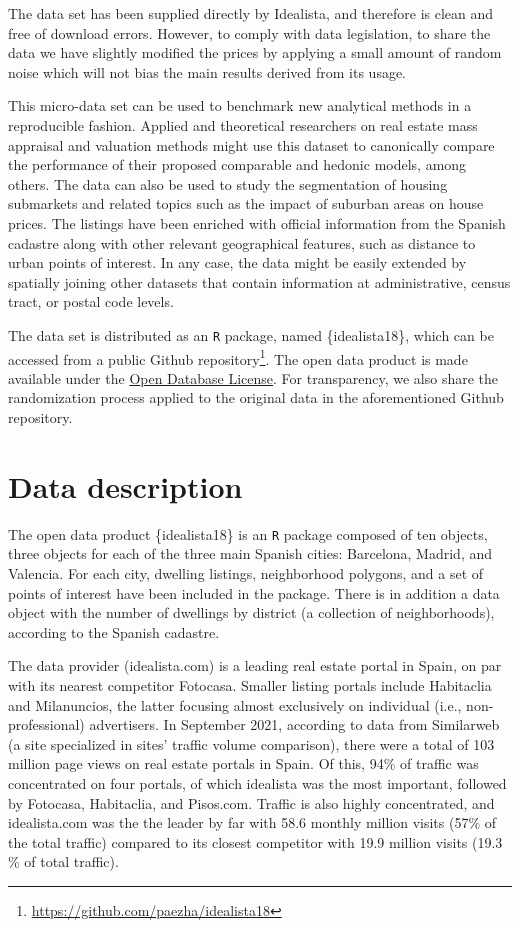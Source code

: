 \documentclass[Royal,times,sageh]{sagej}
\begin{document}
The data set has been supplied directly by Idealista, and therefore is
clean and free of download errors. However, to comply with data
legislation, to share the data we have slightly modified the prices by
applying a small amount of random noise which will not bias the main
results derived from its usage.

This micro-data set can be used to benchmark new analytical methods in a
reproducible fashion. Applied and theoretical researchers on real estate
mass appraisal and valuation methods might use this dataset to
canonically compare the performance of their proposed comparable and
hedonic models, among others. The data can also be used to study the
segmentation of housing submarkets and related topics such as the impact
of suburban areas on house prices. The listings have been enriched with
official information from the Spanish cadastre along with other relevant
geographical features, such as distance to urban points of interest. In
any case, the data might be easily extended by spatially joining other
datasets that contain information at administrative, census tract, or
postal code levels.

The data set is distributed as an \texttt{R} package, named
\{idealista18\}, which can be accessed from a public Github
repository\footnote{\url{https://github.com/paezha/idealista18}}. The
open data product is made available under the
\href{http://opendatacommons.org/licenses/odbl/1.0/}{Open Database License}.
For transparency, we also share the randomization process applied to the
original data in the aforementioned Github repository.

\hypertarget{data-description}{%
\section{Data description}\label{data-description}}

The open data product \{idealista18\} is an \texttt{R} package composed
of ten objects, three objects for each of the three main Spanish cities:
Barcelona, Madrid, and Valencia. For each city, dwelling listings,
neighborhood polygons, and a set of points of interest have been
included in the package. There is in addition a data object with the
number of dwellings by district (a collection of neighborhoods),
according to the Spanish cadastre.

The data provider (idealista.com) is a leading real estate portal in
Spain, on par with its nearest competitor Fotocasa. Smaller listing
portals include Habitaclia and Milanuncios, the latter focusing almost
exclusively on individual (i.e., non-professional) advertisers. In
September 2021, according to data from Similarweb (a site specialized in
sites' traffic volume comparison), there were a total of 103 million
page views on real estate portals in Spain. Of this, 94\% of traffic was
concentrated on four portals, of which idealista was the most important,
followed by Fotocasa, Habitaclia, and Pisos.com. Traffic is also highly
concentrated, and idealista.com was the the leader by far with 58.6
monthly million visits (57\% of the total traffic) compared to its
closest competitor with 19.9 million visits (19.3 \% of total traffic).
\end{document}
